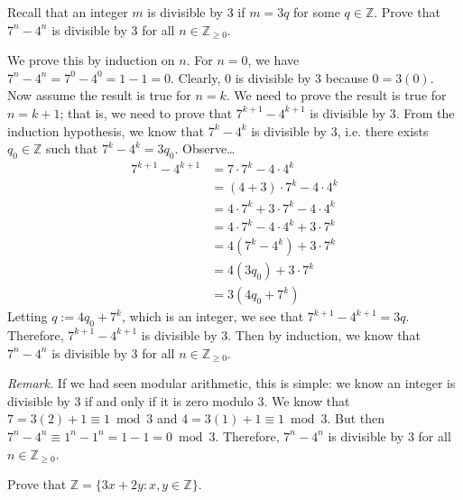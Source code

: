 \documentclass[11pt,letterpaper]{article}
\begin{document}
\newpage



 Recall that an integer $m$ is divisible by 3 if $m= 3q$ for some $q \in \mathbb{Z}$. Prove that $7^n - 4^n$ is divisible by 3 for all $n \in \mathbb{Z}_{\geq 0}$. \pspace

\sol We prove this by induction on $n$. For $n= 0$, we have $7^n - 4^n= 7^0 - 4^0= 1 - 1= 0$. Clearly, $0$ is divisible by $3$ because $0= 3(0)$. Now assume the result is true for $n= k$. We need to prove the result is true for $n= k + 1$; that is, we need to prove that $7^{k+1} - 4^{k+1}$ is divisible by $3$. From the induction hypothesis, we know that $7^k - 4^k$ is divisible by $3$, i.e. there exists $q_0 \in \mathbb{Z}$ such that $7^k - 4^k= 3q_0$. Observe\dots
	\[
	\begin{aligned}
	7^{k+1} - 4^{k + 1}&= 7 \cdot 7^k - 4 \cdot 4^k \\[0.3cm]
	&= (4 + 3) \cdot 7^k - 4 \cdot 4^k \\[0.3cm]
	&= 4 \cdot 7^k + 3 \cdot 7^k - 4 \cdot 4^k \\[0.3cm]
	&= 4 \cdot 7^k - 4 \cdot 4^k + 3 \cdot 7^k \\[0.3cm]
	&= 4 \left( 7^k - 4^k \right) + 3 \cdot 7^k \\[0.3cm]
	&= 4 (3q_0) + 3 \cdot 7^k \\[0.3cm]
	&= 3(4q_0 + 7^k)
	\end{aligned}
	\]
Letting $q:= 4q_0 + 7^k$, which is an integer, we see that $7^{k+1} - 4^{k+1}= 3q$. Therefore, $7^{k+1} - 4^{k+1}$ is divisible by $3$. Then by induction, we know that $7^n - 4^n$ is divisible by $3$ for all $n \in \mathbb{Z}_{\geq 0}$. 

\vfill 

{\itshape Remark.} If we had seen modular arithmetic, this is simple: we know an integer is divisible by $3$ if and only if it is zero modulo $3$. We know that $7= 3(2) + 1 \equiv 1 \bmod 3$ and $4= 3(1) + 1 \equiv 1 \bmod 3$. But then $7^n - 4^n \equiv 1^n - 1^n= 1 - 1= 0 \bmod 3$. Therefore, $7^n - 4^n$ is divisible by $3$ for all $n \in \mathbb{Z}_{\geq 0}$. 



\newpage



 Prove that $\mathbb{Z}= \{ 3x + 2y \colon x, y \in \mathbb{Z} \}$. \pspace
\end{document}
